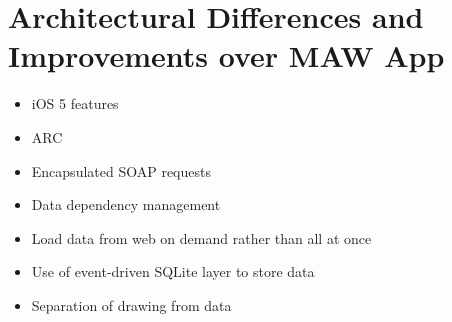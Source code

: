 \section{Architectural Differences and Improvements over MAW App}
\label{sect:kegg_differences}

\begin{itemize}
     \item iOS 5 features
     \item ARC
     \item Encapsulated SOAP requests
     \item Data dependency management
     \item Load data from web on demand rather than all at once
     \item Use of event-driven SQLite layer to store data
     \item Separation of drawing from data
\end{itemize}
